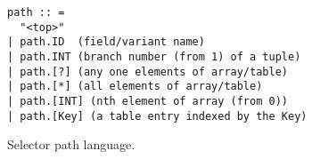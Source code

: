 

    
\begin{figure}
{\small
\begin{verbatim}
path :: =  
  "<top>"
| path.ID  (field/variant name)
| path.INT (branch number (from 1) of a tuple)
| path.[?] (any one elements of array/table) 
| path.[*] (all elements of array/table) 
| path.[INT] (nth element of array (from 0))
| path.[Key] (a table entry indexed by the Key)
\end{verbatim}
}
\caption{Selector path language.}
\label{fig:selector-lang}
\end{figure}


